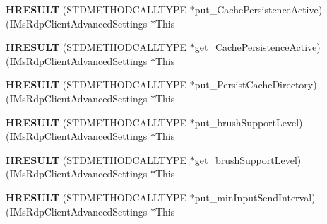 \begin{DoxyCompactItemize}
\item 
\mbox{\label{struct_i_ms_rdp_client_advanced_settings_vtbl_a93a67939de13dc6fcefe6a56710f69ac}} 
{\bfseries H\+R\+E\+S\+U\+LT} (S\+T\+D\+M\+E\+T\+H\+O\+D\+C\+A\+L\+L\+T\+Y\+PE $\ast$put\+\_\+\+Cache\+Persistence\+Active)(I\+Ms\+Rdp\+Client\+Advanced\+Settings $\ast$This
\item 
\mbox{\label{struct_i_ms_rdp_client_advanced_settings_vtbl_ac8cf5a6f1cc03d88659d82b8a774b6ad}} 
{\bfseries H\+R\+E\+S\+U\+LT} (S\+T\+D\+M\+E\+T\+H\+O\+D\+C\+A\+L\+L\+T\+Y\+PE $\ast$get\+\_\+\+Cache\+Persistence\+Active)(I\+Ms\+Rdp\+Client\+Advanced\+Settings $\ast$This
\item 
\mbox{\label{struct_i_ms_rdp_client_advanced_settings_vtbl_af525ee52e35a4bcc9908673097be26fa}} 
{\bfseries H\+R\+E\+S\+U\+LT} (S\+T\+D\+M\+E\+T\+H\+O\+D\+C\+A\+L\+L\+T\+Y\+PE $\ast$put\+\_\+\+Persist\+Cache\+Directory)(I\+Ms\+Rdp\+Client\+Advanced\+Settings $\ast$This
\item 
\mbox{\label{struct_i_ms_rdp_client_advanced_settings_vtbl_af69efc0c5f74b73a971e621082eab9b9}} 
{\bfseries H\+R\+E\+S\+U\+LT} (S\+T\+D\+M\+E\+T\+H\+O\+D\+C\+A\+L\+L\+T\+Y\+PE $\ast$put\+\_\+brush\+Support\+Level)(I\+Ms\+Rdp\+Client\+Advanced\+Settings $\ast$This
\item 
\mbox{\label{struct_i_ms_rdp_client_advanced_settings_vtbl_aaa82baa7d9c8a7593049dbb39a45ef1e}} 
{\bfseries H\+R\+E\+S\+U\+LT} (S\+T\+D\+M\+E\+T\+H\+O\+D\+C\+A\+L\+L\+T\+Y\+PE $\ast$get\+\_\+brush\+Support\+Level)(I\+Ms\+Rdp\+Client\+Advanced\+Settings $\ast$This
\item 
\mbox{\label{struct_i_ms_rdp_client_advanced_settings_vtbl_af0a0195aad7e9549ee445b1ef9916e6c}} 
{\bfseries H\+R\+E\+S\+U\+LT} (S\+T\+D\+M\+E\+T\+H\+O\+D\+C\+A\+L\+L\+T\+Y\+PE $\ast$put\+\_\+min\+Input\+Send\+Interval)(I\+Ms\+Rdp\+Client\+Advanced\+Settings $\ast$This
\item 
\mbox{\label{struct_i_ms_rdp_client_advanced_settings_vtbl_a13681c38dd0e2a71f046d46d45887739}} 

\end{DoxyCompactItemize}
